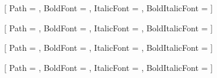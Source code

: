 
\usepackage{fontspec}
\usepackage{polyglossia}


\setmainfont{\ConfigFontRegular}[
    Path = \ConfigFontPath,
    BoldFont = \ConfigFontBold,
    ItalicFont = \ConfigFontItalic,
    BoldItalicFont = \ConfigFontBoldItalic
]


\newfontfamily\cyrillicfont{\ConfigFontRegular}[
    Path = \ConfigFontPath,
    BoldFont = \ConfigFontBold,
    ItalicFont = \ConfigFontItalic,
    BoldItalicFont = \ConfigFontBoldItalic
]


\newfontfamily\cyrillicfonttt{\ConfigFontRegular}[
    Path = \ConfigFontPath,
    BoldFont = \ConfigFontBold,
    ItalicFont = \ConfigFontItalic,
    BoldItalicFont = \ConfigFontBoldItalic
]


\newfontfamily\codefont{\ConfigCodeFontRegular}[
    Path = \ConfigCodeFontPath,
    BoldFont = \ConfigCodeFontBold,
    ItalicFont = \ConfigCodeFontItalic,
    BoldItalicFont = \ConfigCodeFontBoldItalic
]


\setmainlanguage{russian}

